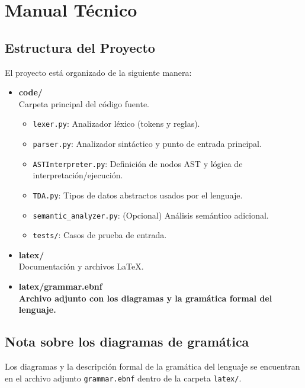 \documentclass{article}
\begin{document}

\section{Manual Técnico}\label{sec:man_t}

\subsection{Estructura del Proyecto}

El proyecto está organizado de la siguiente manera:

\begin{itemize}
    \item \textbf{code/} \\ Carpeta principal del código fuente.
    \begin{itemize}
        \item \texttt{lexer.py}: Analizador léxico (tokens y reglas).
        \item \texttt{parser.py}: Analizador sintáctico y punto de entrada principal.
        \item \texttt{ASTInterpreter.py}: Definición de nodos AST y lógica de interpretación/ejecución.
        \item \texttt{TDA.py}: Tipos de datos abstractos usados por el lenguaje.
        \item \texttt{semantic\_analyzer.py}: (Opcional) Análisis semántico adicional.
        \item \texttt{tests/}: Casos de prueba de entrada.
    \end{itemize}
    \item \textbf{latex/} \\ Documentación y archivos LaTeX.
    \item \textbf{latex/grammar.ebnf} \\ \textbf{Archivo adjunto con los diagramas y la gramática formal del lenguaje.}
\end{itemize}

\subsection*{Nota sobre los diagramas de gramática}

Los diagramas y la descripción formal de la gramática del lenguaje se encuentran en el archivo adjunto \texttt{grammar.ebnf} dentro de la carpeta \texttt{latex/}.
\end{document}
